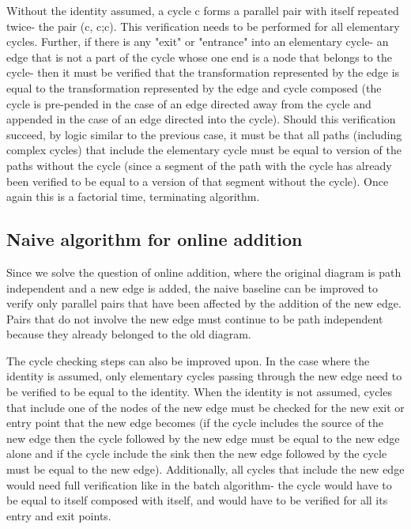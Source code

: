 \documentclass[runningheads]{llncs}
\begin{document}
Without the identity assumed, a cycle c forms a parallel pair with itself repeated twice- the pair (c, c;c). This verification needs to be performed for all elementary cycles. Further, if there is any "exit" or "entrance" into an elementary cycle- an edge that is not a part of the cycle whose one end is a node that belongs to the cycle- then it must be verified that the transformation represented by the edge is equal to the transformation represented by the edge and cycle composed (the cycle is pre-pended in the case of an edge directed away from the cycle and appended in the case of an edge directed into the cycle). Should this verification succeed, by logic similar to the previous case, it must be that 
all paths (including complex cycles) that include the elementary cycle must be equal to version of the paths without the cycle (since a segment of the path with the cycle has already been verified to be equal to a version of that segment without the cycle). Once again this is a factorial time, terminating algorithm.

\subsection{Naive algorithm for online addition}

Since we solve the question of online addition, where the original diagram is path independent and a new edge is added, the naive baseline can be improved to verify only parallel pairs that have been affected by the addition of the new edge. Pairs that do not involve the new edge must continue to be path independent because they already belonged to the old diagram.

The cycle checking steps can also be improved upon. In the case where the identity is assumed, only elementary cycles passing through the new edge need to be verified to be equal to the identity. When the identity is not assumed, cycles that include one of the nodes of the new edge must be checked for the new exit or entry point that the new edge becomes (if the cycle includes the source of the new edge then the cycle followed by the new edge must be equal to the new edge alone and if the cycle include the sink then the new edge followed by the cycle must be equal to the new edge).
Additionally, all cycles that include the new edge would need full verification like in the batch algorithm- the cycle would have to be equal to itself composed with itself, and would have to be verified for all its entry and exit points.
\end{document}
